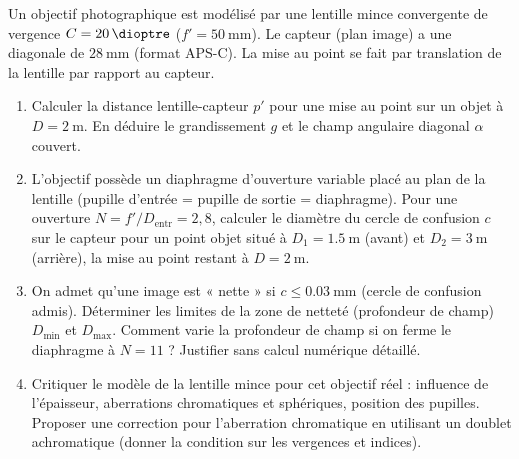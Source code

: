 \documentclass[11pt]{article}
\begin{document}
\begin{exercice}
Un objectif photographique est modélisé par une lentille mince convergente de vergence $C = \SI{+20}{\dioptre}$ ($f' = \SI{50}{\milli\metre}$). Le capteur (plan image) a une diagonale de $\SI{28}{\milli\metre}$ (format APS-C). La mise au point se fait par translation de la lentille par rapport au capteur.
\begin{enumerate}
    \item Calculer la distance lentille-capteur $p'$ pour une mise au point sur un objet à $D = \SI{2}{\metre}$. En déduire le grandissement $g$ et le champ angulaire diagonal $\alpha$ couvert.
    \item L'objectif possède un diaphragme d'ouverture variable placé au plan de la lentille (pupille d'entrée = pupille de sortie = diaphragme). Pour une ouverture $N = f'/D_{\text{entr}} = 2,8$, calculer le diamètre du cercle de confusion $c$ sur le capteur pour un point objet situé à $D_1 = \SI{1,5}{\metre}$ (avant) et $D_2 = \SI{3}{\metre}$ (arrière), la mise au point restant à $D = \SI{2}{\metre}$.
    \item On admet qu'une image est « nette » si $c \le \SI{0,03}{\milli\metre}$ (cercle de confusion admis). Déterminer les limites de la zone de netteté (profondeur de champ) $D_{\text{min}}$ et $D_{\text{max}}$. Comment varie la profondeur de champ si on ferme le diaphragme à $N=11$ ? Justifier sans calcul numérique détaillé.
    \item Critiquer le modèle de la lentille mince pour cet objectif réel : influence de l'épaisseur, aberrations chromatiques et sphériques, position des pupilles. Proposer une correction pour l'aberration chromatique en utilisant un doublet achromatique (donner la condition sur les vergences et indices).
\end{enumerate}
\end{exercice}
\end{document}
